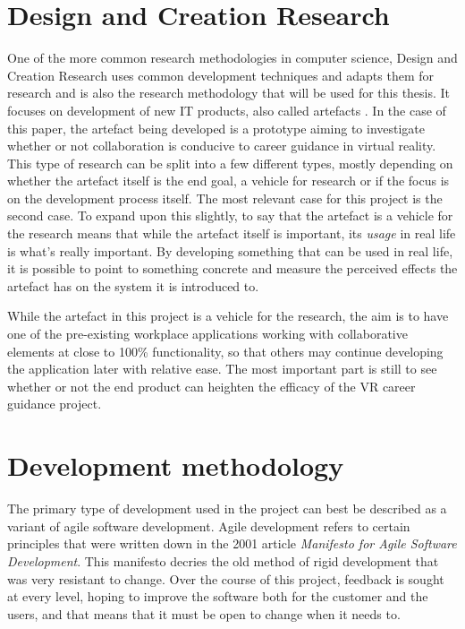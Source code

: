 \section{Design and Creation Research}
\label{sec:designCreationResearch}
One of the more common research methodologies in computer science, Design and Creation Research uses common development techniques and adapts them for research and is also the research methodology that will be used for this thesis. It focuses on development of new IT products, also called artefacts \cite{oates2005researching}. In the case of this paper, the artefact being developed is a prototype aiming to investigate whether or not collaboration is conducive to career guidance in virtual reality. This type of research can be split into a few different types, mostly depending on whether the artefact itself is the end goal, a vehicle for research or if the focus is on the development process itself. The most relevant case for this project is the second case. To expand upon this slightly, to say that the artefact is a vehicle for the research means that while the artefact itself is important, its \textit{usage} in real life is what's really important. By developing something that can be used in real life, it is possible to point to something concrete and measure the perceived effects the artefact has on the system it is introduced to.

While the artefact in this project is a vehicle for the research, the aim is to have one of the pre-existing workplace applications working with collaborative elements at close to 100\% functionality, so that others may continue developing the application later with relative ease. The most important part is still to see whether or not the end product can heighten the efficacy of the VR career guidance project.


\section{Development methodology}
The primary type of development used in the project can best be described as a variant of agile software development. Agile development refers to certain principles that were written down in the 2001 article \textit{Manifesto for Agile Software Development}\cite{beck2001manifesto}. This manifesto decries the old method of rigid development that was very resistant to change. Over the course of this project, feedback is sought at every level, hoping to improve the software both for the customer and the users, and that means that it must be open to change when it needs to.

